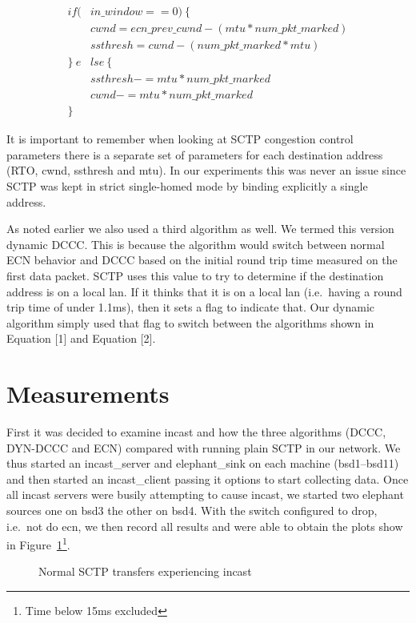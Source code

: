 \documentclass[12pt]{article}
\begin{document}
\begin{equation}
\begin{split}
if (&in\_window == 0)~\{ \\
&cwnd = ecn\_prev\_cwnd - (mtu * num\_pkt\_marked) \\
&ssthresh = cwnd - (num\_pkt\_marked * mtu) \\
\}~e&lse~\{\\
&ssthresh -= mtu * num\_pkt\_marked \\
&cwnd -= mtu * num\_pkt\_marked\\
\}~~&
\end{split}
\end{equation}

It is important to remember when looking at SCTP congestion control parameters there
is a separate set of parameters for each destination address (RTO, cwnd, ssthresh and mtu). In
our experiments this was never an issue since SCTP was kept in strict single-homed mode
by binding explicitly a single address. 

As noted earlier we also used a third algorithm as well. We termed this version dynamic DCCC. This
is because the algorithm would switch between normal ECN behavior and DCCC based on the
initial round trip time measured on the first data packet. SCTP uses this value to try to determine
if the destination address is on a local lan. If it thinks that it is on a local lan (i.e.~having a round
trip time of under 1.1ms), then it sets a flag to indicate that. Our dynamic algorithm simply used
that flag to switch between the algorithms shown in Equation [1] and Equation [2].

\section{Measurements}
\label{measure}
First it was decided to examine incast and how the three algorithms (DCCC, DYN-DCCC and ECN) compared with
running plain SCTP in our network. We thus started an incast\_server and elephant\_sink on each machine (bsd1--bsd11) and then 
started an incast\_client passing it options to start collecting data. Once all incast servers were busily attempting to cause
incast, we started two elephant sources one on bsd3 the other on bsd4. With the switch configured to drop, i.e.~not do ecn, we
then record all results and were able to obtain the plots show in Figure~\ref{fig:noEcnIncast}\footnote{Time below 15ms excluded}.
\begin{figure}[h]
\centering
{}
\caption{Normal SCTP transfers experiencing incast}
\label{fig:noEcnIncast}
\end{figure}
\end{document}
